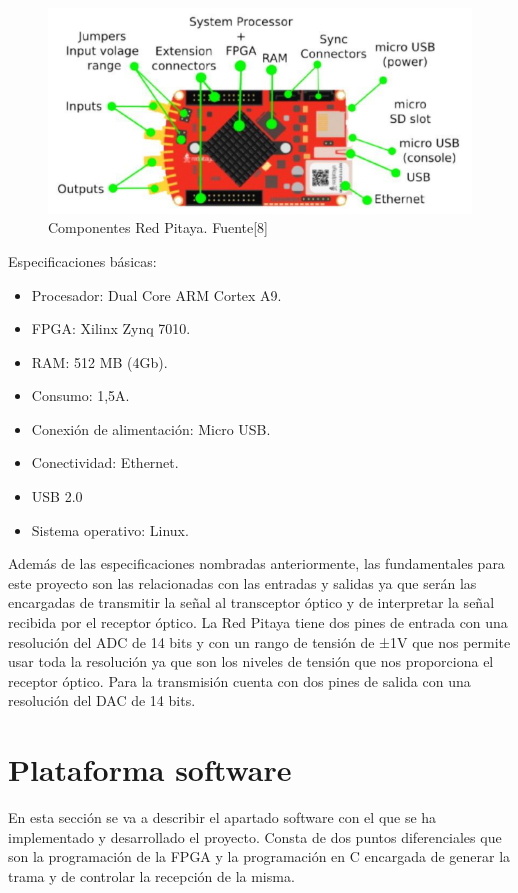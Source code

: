 \begin{figure}[ht]
    \centering
    \includegraphics[scale=0.80]{./figuras/comp_pitaya.png}
    \caption{\small{Componentes Red Pitaya. Fuente[8]}}
    \label{com_pitaya}%
\end{figure}

Especificaciones básicas: \cite{pitaya}
\begin{itemize}
    \item Procesador: Dual Core ARM Cortex A9.
    \item FPGA: Xilinx Zynq 7010.
    \item RAM: 512 MB (4Gb).
    \item Consumo: 1,5A.
    \item Conexión de alimentación: Micro USB.
    \item Conectividad: Ethernet.
    \item USB 2.0
    \item Sistema operativo: Linux.
\end{itemize}

Además de las especificaciones nombradas anteriormente, las fundamentales para este 
proyecto son las relacionadas con las entradas y salidas ya que serán las encargadas
de transmitir la señal al transceptor óptico y de interpretar la señal recibida por 
el receptor óptico. La Red Pitaya tiene dos pines de entrada con una resolución del 
ADC de 14 bits y con un rango de tensión de ±1V que nos permite usar toda la resolución
ya que son los niveles de tensión que nos proporciona el receptor óptico. Para la 
transmisión cuenta con dos pines de salida con una resolución del DAC de 14 bits. \cite{pitaya}


\section{Plataforma software}
En esta sección se va a describir el apartado software con el que se ha implementado
y desarrollado el proyecto. Consta de dos puntos diferenciales que son la 
programación de la FPGA y la programación en C encargada de generar la trama y de 
controlar la recepción de la misma.

